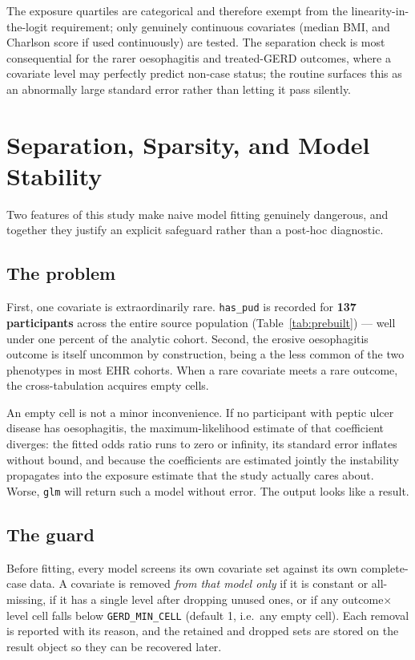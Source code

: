 \documentclass[11pt]{article}
\newcommand{\code}[1]{\texttt{\small #1}}
\begin{document}
\noindent The exposure quartiles are categorical and therefore exempt from the linearity-in-the-logit
requirement; only genuinely continuous covariates (median BMI, and Charlson score if used continuously)
are tested. The separation check is most consequential for the rarer oesophagitis and treated-GERD
outcomes, where a covariate level may perfectly predict non-case status; the routine surfaces this as
an abnormally large standard error rather than letting it pass silently.

\section{Separation, Sparsity, and Model Stability}
\label{sec:guard}
Two features of this study make naive model fitting genuinely dangerous, and together they justify an
explicit safeguard rather than a post-hoc diagnostic.

\subsection{The problem}
First, one covariate is extraordinarily rare. \code{has_pud} is recorded for \textbf{137 participants}
across the entire source population (Table~\ref{tab:prebuilt}) --- well under one percent of the
analytic cohort. Second, the erosive oesophagitis outcome is itself uncommon by construction, being a
the less common of the two phenotypes in most EHR cohorts. When a rare covariate meets a rare outcome, the
cross-tabulation acquires empty cells.

An empty cell is not a minor inconvenience. If no participant with peptic ulcer disease has
oesophagitis, the maximum-likelihood estimate of that coefficient diverges: the fitted odds ratio runs
to zero or infinity, its standard error inflates without bound, and because the coefficients are
estimated jointly the instability propagates into the exposure estimate that the study actually cares
about. Worse, \code{glm} will return such a model without error. The output looks like a result.

\subsection{The guard}
Before fitting, every model screens its own covariate set against its own complete-case data. A
covariate is removed \emph{from that model only} if it is constant or all-missing, if it has a single
level after dropping unused ones, or if any outcome$\times$level cell falls below
\code{GERD_MIN_CELL} (default 1, i.e.\ any empty cell). Each removal is reported with its reason, and
the retained and dropped sets are stored on the result object so they can be recovered later.
\end{document}
